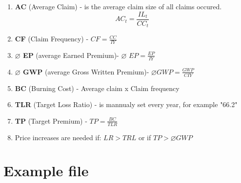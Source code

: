 \documentclass[11pt,a4paper,fleqn]{article}      %
\begin{document}
\begin{enumerate}
\item \textbf{AC} (Average Claim) - is the average claim size of all claims occured.
$$AC_t=\frac{IL_t}{CC_t}$$



\item \textbf{CF} (Claim Frequency) - $CF=\frac{CC}{IY}$

\item \textbf{$\varnothing$ EP} (average Earned Premium)- $\varnothing$ $EP =\frac{EP}{IY}$

\item \textbf{$\varnothing$ GWP} (average Gross Written Premium)- $\varnothing GWP =\frac{GWP}{CIY}$

\item \textbf{BC} (Burning Cost) - Average claim x Claim frequency

\item \textbf{TLR} (Target Loss Ratio) - is mannualy set every year, for example "66.2"

\item \textbf{TP} (Target Premium) - $TP=\frac{BC}{TLR}$

\item Price increases are needed if: $LR> TRL$ or if $TP>\varnothing GWP$



\end{enumerate}


\section{Example file}
\end{document}
